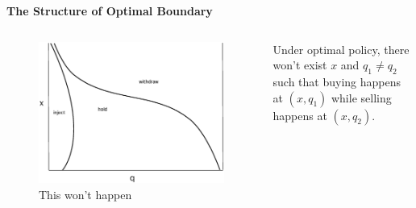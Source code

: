 \documentclass{beamer}
\begin{document}
\begin{frame}
{\bf The Structure of Optimal Boundary}

\begin{columns}
  \begin{figure}[hbt]
  \includegraphics[scale = 0.25]{wonthappen.eps}
  \caption{This won't happen}
  \end{figure}
   \begin{theorem}
    Under optimal policy, there won't exist $x$ and $q_1 \neq q_2$ such that buying happens at $(x,q_1)$ while selling happens at $(x,q_2)$.
    \end{theorem}
\end{columns}


\end{frame}
\end{document}
